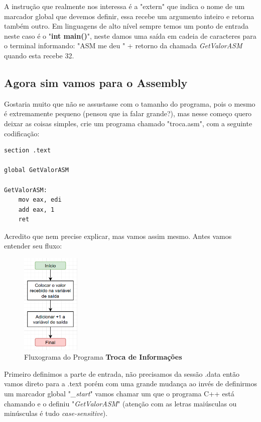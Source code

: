 A instrução que realmente nos interessa é a "extern" que indica o nome de um marcador global que devemos definir, essa recebe um argumento inteiro e retorna também outro. Em linguagens de alto nível sempre temos um ponto de entrada neste caso é o "\textbf{int main()}", neste damos uma saída em cadeia de caracteres para o terminal informando: "ASM me deu " + retorno da chamada \textit{GetValorASM} quando esta recebe 32.

\subsection{Agora sim vamos para o Assembly}
Gostaria muito que não se assustasse com o tamanho do programa, pois o mesmo é extremamente pequeno (pensou que ia falar grande?), mas nesse começo quero deixar as coisas simples, crie um programa chamado "troca.asm", com a seguinte codificação:
\begin{lstlisting}[]
section .text

global GetValorASM

GetValorASM:
	mov eax, edi
	add eax, 1
	ret	
\end{lstlisting}

Acredito que nem precise explicar, mas vamos assim mesmo. Antes vamos entender seu fluxo:
\begin{figure}[H]
	\centering
	\includegraphics[width=0.25\textwidth]{Pictures/cap02/programa5}
	\caption{Fluxograma do Programa \textbf{Troca de Informações}}
\end{figure}

Primeiro definimos a parte de entrada, não precisamos da sessão .data então vamos direto para a .text porém com uma grande mudança ao invés de definirmos um marcador global "\textit{\_start}" vamos chamar um que o programa C++ está chamando e o definiu "\textit{GetValorASM}" (atenção com as letras maiúsculas ou minúsculas é tudo \textit{case-sensitive}). 

